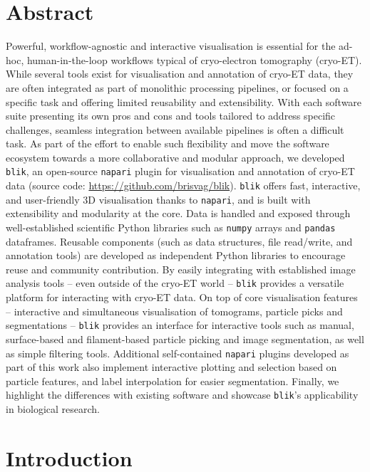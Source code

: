 \section{Abstract}
Powerful, workflow-agnostic and interactive visualisation is essential for the ad-hoc, human-in-the-loop workflows typical of cryo-electron tomography (cryo-ET). While several tools exist for visualisation and annotation of cryo-ET data, they are often integrated as part of monolithic processing pipelines, or focused on a specific task and offering limited reusability and extensibility. With each software suite presenting its own pros and cons and tools tailored to address specific challenges, seamless integration between available pipelines is often a difficult task.
As part of the effort to enable such flexibility and move the software ecosystem towards a more collaborative and modular approach, we developed \texttt{blik}, an open-source \texttt{napari} plugin for visualisation and annotation of cryo-ET data (source code: \url{https://github.com/brisvag/blik}).
\texttt{blik} offers fast, interactive, and user-friendly 3D visualisation thanks to \texttt{napari}, and is built with extensibility and modularity at the core. Data is handled and exposed through well-established scientific Python libraries such as \texttt{numpy} arrays and \texttt{pandas} dataframes. Reusable components (such as data structures, file read/write, and annotation tools) are developed as independent Python libraries to encourage reuse and community contribution. By easily integrating with established image analysis tools -- even outside of the cryo-ET world -- \texttt{blik} provides a versatile platform for interacting with cryo-ET data.
On top of core visualisation features -- interactive and simultaneous visualisation of tomograms, particle picks and segmentations -- \texttt{blik} provides an interface for interactive tools such as manual, surface-based and filament-based particle picking and image segmentation, as well as simple filtering tools. Additional self-contained \texttt{napari} plugins developed as part of this work also implement interactive plotting and selection based on particle features, and label interpolation for easier segmentation.
Finally, we highlight the differences with existing software and showcase \texttt{blik}'s applicability in biological research.

\section{Introduction}

